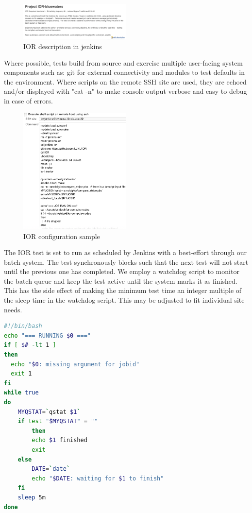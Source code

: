 \documentclass[10pt, conference, compsocconf]{IEEEtran}
\begin{document}
{\begin{figure}[H]
\centering
\includegraphics[width=0.5\textwidth]{IOR-bluewaters-descr}
\caption{ IOR description in jenkins }
\label{fig:IOR-bluewaters-descr}
\end{figure}
Where possible, tests build from source and exercise multiple user-facing system components such as: git for external connectivity and modules to test defaults in the environment. 
 Where scripts on the remote SSH site are used, they are echoed and/or displayed with "cat -n" to make console output verbose and easy to debug in case of errors. 
 
\begin{figure}[H]
\centering
\includegraphics[width=0.5\textwidth]{IOR-configuration-sample}
\caption{ IOR configuration sample }
\label{fig:IOR-configuration-sample}
\end{figure}
The IOR test is set to run as scheduled by Jenkins with a best-effort through our batch system.  The test synchronously blocks such that the next test will not start until the previous one has completed.  We employ a watchdog script to monitor the batch queue and keep the test active until the system marks it as finished.  This has the side effect of making the minimum test time an integer multiple of the sleep time in the watchdog script.  This may be adjusted to fit individual site needs.
\begin{lstlisting}[frame=tb,captionpos=t,language=bash,caption={pbs/torque watchdog script}, label=lst:watchdog]
#!/bin/bash
echo "=== RUNNING $0 ==="
if [ $# -lt 1 ]
then
  echo "$0: missing argument for jobid"
  exit 1
fi
while true
do
	MYQSTAT=`qstat $1`
	if test "$MYQSTAT" = ""
        then
		echo $1 finished
		exit
	else
		DATE=`date`
		echo "$DATE: waiting for $1 to finish"
	fi
	sleep 5m
done
\end{lstlisting}

}
\end{document}
